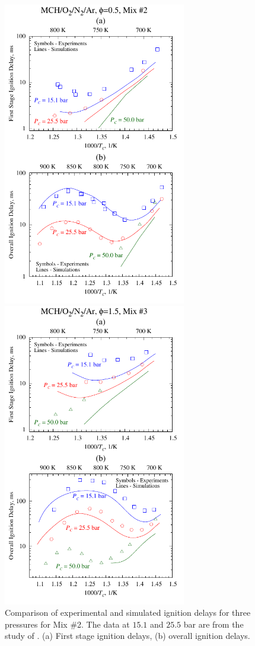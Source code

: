 \documentclass[12pt, letterpaper]{article}
\begin{document}
\begin{figure}
    \centering
    \begin{minipage}{0.45\textwidth}
        \includegraphics[width=8cm]{../figures/05-MCH/mch-model-2}
        \caption{Comparison of experimental and simulated ignition delays for three 
            pressures for Mix \#2. The data at $15.1$ and $25.5$ bar are from the 
            study of \textcite{Mittal2009}. (a) First stage ignition delays, 
            (b) overall ignition delays.}
        \label{fig:mch-model-2}
    \end{minipage}
    \quad
    \begin{minipage}{0.45\textwidth}
        \includegraphics[width=8cm]{../figures/05-MCH/mch-model-3}

\end{minipage}
\end{figure}
\end{document}
